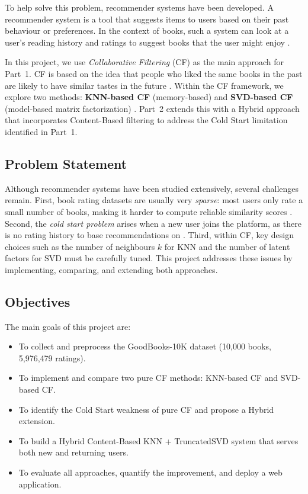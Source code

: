 \documentclass[12pt, a4paper]{article}
\begin{document}
To help solve this problem, recommender systems have been developed.
A recommender system is a tool that suggests items to users based on their past behaviour or preferences.
In the context of books, such a system can look at a user's reading history and ratings to suggest books that the user might enjoy \cite{ricci2011}.

In this project, we use \textit{Collaborative Filtering} (CF) as the main approach for Part~1.
CF is based on the idea that people who liked the same books in the past are likely to have similar tastes in the future \cite{koren2009}.
Within the CF framework, we explore two methods: \textbf{KNN-based CF} (memory-based) and \textbf{SVD-based CF} (model-based matrix factorization) \cite{ricci2011}.
Part~2 extends this with a Hybrid approach that incorporates Content-Based filtering
to address the Cold Start limitation identified in Part~1.

\subsection{Problem Statement}

Although recommender systems have been studied extensively, several challenges remain.
First, book rating datasets are usually very \textit{sparse}: most users only rate a small number of books,
making it harder to compute reliable similarity scores \cite{su2009}.
Second, the \textit{cold start problem} arises when a new user joins the platform,
as there is no rating history to base recommendations on \cite{schein2002}.
Third, within CF, key design choices such as the number of neighbours $k$ for KNN
and the number of latent factors for SVD must be carefully tuned.
This project addresses these issues by implementing, comparing, and extending both approaches.

\subsection{Objectives}

The main goals of this project are:

\begin{itemize}[leftmargin=2cm]
  \item To collect and preprocess the GoodBooks-10K dataset (10,000 books, 5,976,479 ratings).
  \item To implement and compare two pure CF methods: KNN-based CF and SVD-based CF.
  \item To identify the Cold Start weakness of pure CF and propose a Hybrid extension.
  \item To build a Hybrid Content-Based KNN + TruncatedSVD system that serves both new and returning users.
  \item To evaluate all approaches, quantify the improvement, and deploy a web application.
\end{itemize}
\end{document}
